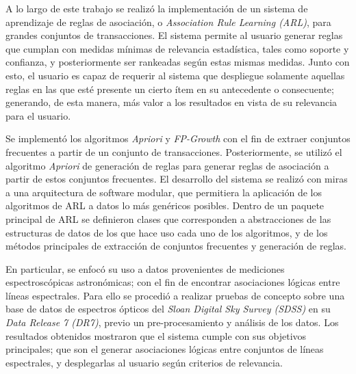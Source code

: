 \begin{conclusion}


A lo largo de este trabajo se realizó la implementación de un sistema de aprendizaje de reglas de asociación, o \textit{Association Rule Learning (ARL)}, para grandes conjuntos de transacciones. El sistema permite al usuario generar reglas que cumplan con medidas mínimas de relevancia estadística, tales como soporte y confianza, y posteriormente ser rankeadas según estas mismas medidas. Junto con esto, el usuario es capaz de requerir al sistema que despliegue solamente aquellas reglas en las que esté presente un cierto ítem en su antecedente o consecuente; generando, de esta manera, más valor a los resultados en vista de su relevancia para el usuario.

Se implementó los algoritmos \textit{Apriori} y \textit{FP-Growth} con el fin de extraer conjuntos frecuentes a partir de un conjunto de transacciones. Posteriormente, se utilizó el algoritmo \textit{Apriori} de generación de reglas para generar reglas de asociación a partir de estos conjuntos frecuentes. El desarrollo del sistema se realizó con miras a una arquitectura de software modular, que permitiera la aplicación de los algoritmos de ARL a datos lo más genéricos posibles. Dentro de un paquete principal de ARL se definieron clases que corresponden a abstracciones de las estructuras de datos de los que hace uso cada uno de los algoritmos, y de los métodos principales de extracción de conjuntos frecuentes y generación de reglas.

En particular, se enfocó su uso a datos provenientes de mediciones espectroscópicas astronómicas; con el fin de encontrar asociaciones lógicas entre líneas espectrales. Para ello se procedió a realizar pruebas de concepto sobre una base de datos de espectros ópticos del \textit{Sloan Digital Sky Survey (SDSS)} en su \textit{Data Release 7 (DR7)}, previo un pre-procesamiento y análisis de los datos. Los resultados obtenidos mostraron que el sistema cumple con sus objetivos principales; que son el generar asociaciones lógicas entre conjuntos de líneas espectrales, y desplegarlas al usuario según criterios de relevancia.


\end{conclusion}
